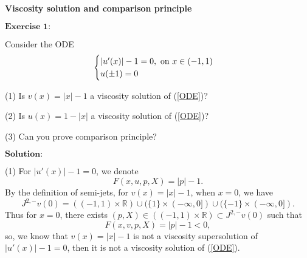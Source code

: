 \documentclass[12pt,a4paper]{ctexart}
\begin{document}
\begin{center}
\textbf{Viscosity solution and comparison principle}
\end{center}

\vspace{12pt}

$\textbf{Exercise 1:}$

Consider the ODE
\begin{equation} \label{ODE}
    \begin{cases}
   |u'(x)| -1 = 0, \hbox{ on } x \in (-1, 1) \\
   u(\pm 1) = 0
   \end{cases}
\end{equation}


(1) Is $v(x) = |x|-1$ a viscosity solution of (\ref{ODE})?

(2) Is $u(x) = 1 - |x|$ a viscosity solution of (\ref{ODE})?

(3) Can you prove comparison principle?

\vspace{8pt}

$\textbf{Solution:}$

(1) For $|u'(x)| - 1 = 0$, we denote 
\begin{equation*} 
    F(x, u, p, X) = |p| - 1.
\end{equation*}
By the definition of semi-jets, for $v(x) = |x| - 1$, when $x = 0$, we have
\begin{equation*}
    J^{2, -} v(0) = ((-1, 1) \times \mathbb{R}) \cup (\{1 \} \times (- \infty, 0]) \cup (\{-1\} \times (- \infty, 0] ).
\end{equation*}
Thus for $x = 0$, there exists $(p, X) \in ((-1, 1) \times \mathbb{R}) \subset J^{2, -}v(0)$ such that
\begin{equation*} 
    F(x, v, p, X) = |p| - 1 < 0,
\end{equation*}
so, we know that $v(x) = |x| - 1$ is not a viscosity supersolution of $|u'(x)| - 1 = 0$, then it is not a viscosity solution of (\ref{ODE}).

\vspace{4pt}
\end{document}
